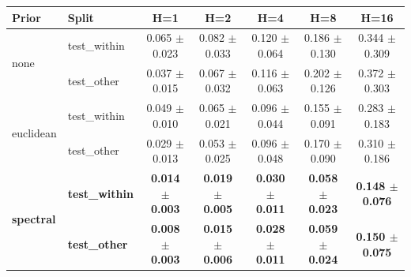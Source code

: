 \begin{tabular}{llccccc}
\toprule
Prior & Split & H=1 & H=2 & H=4 & H=8 & H=16 \\
\midrule
\multirow{2}{*}{none} & test_within & 0.065 $\pm$ 0.023 & 0.082 $\pm$ 0.033 & 0.120 $\pm$ 0.064 & 0.186 $\pm$ 0.130 & 0.344 $\pm$ 0.309 \\
 & test_other & 0.037 $\pm$ 0.015 & 0.067 $\pm$ 0.032 & 0.116 $\pm$ 0.063 & 0.202 $\pm$ 0.126 & 0.372 $\pm$ 0.303 \\
\midrule
\multirow{2}{*}{euclidean} & test_within & 0.049 $\pm$ 0.010 & 0.065 $\pm$ 0.021 & 0.096 $\pm$ 0.044 & 0.155 $\pm$ 0.091 & 0.283 $\pm$ 0.183 \\
 & test_other & 0.029 $\pm$ 0.013 & 0.053 $\pm$ 0.025 & 0.096 $\pm$ 0.048 & 0.170 $\pm$ 0.090 & 0.310 $\pm$ 0.186 \\
\midrule
\multirow{2}{*}{\textbf{spectral}} & \textbf{test_within} & \textbf{0.014 $\pm$ 0.003} & \textbf{0.019 $\pm$ 0.005} & \textbf{0.030 $\pm$ 0.011} & \textbf{0.058 $\pm$ 0.023} & \textbf{0.148 $\pm$ 0.076} \\
 & \textbf{test_other} & \textbf{0.008 $\pm$ 0.003} & \textbf{0.015 $\pm$ 0.006} & \textbf{0.028 $\pm$ 0.011} & \textbf{0.059 $\pm$ 0.024} & \textbf{0.150 $\pm$ 0.075} \\
\bottomrule
\end{tabular}
